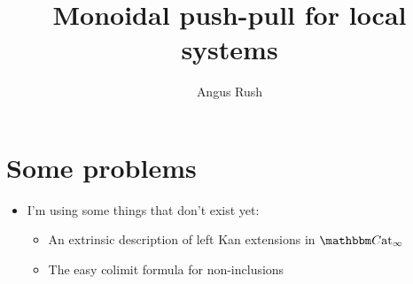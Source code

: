 \documentclass[a4paper,12pt]{scrartcl}
\title{Monoidal push-pull for local systems}
\author{Angus Rush}
\begin{document}
\maketitle 
\tableofcontents

\section{Some problems}
\label{sec:some_problems}

\begin{itemize}
  \item I'm using some things that don't exist yet:
    \begin{itemize}
      \item An extrinsic description of left Kan extensions in $\ICCat$

      \item The easy colimit formula for non-inclusions
    \end{itemize}
\end{itemize}






\end{document}
